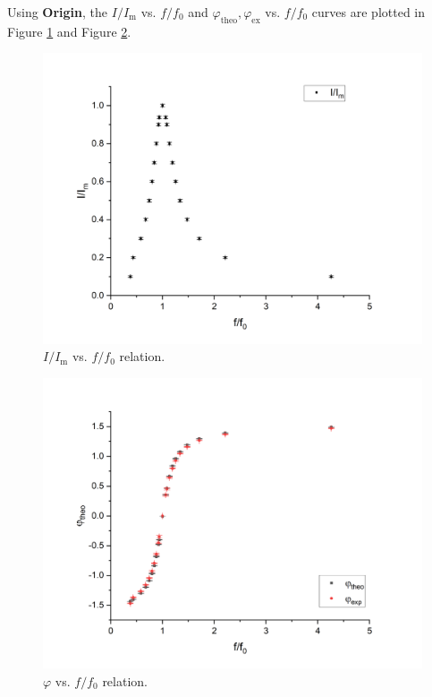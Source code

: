 \documentclass{article}
\begin{document}
Using \textbf{Origin}, the $I/I_\text{m}$ vs. $f/f_0$ and $\varphi_{\text{theo}},\varphi_\text{ex}$ vs. $f/f_0$ curves are plotted in Figure \ref{FigIIm} and Figure \ref{FigPhi}.

\begin{figure}[H]\centering
    \includegraphics[scale=0.5]{I-f.png}
    \caption{$I/I_\text{m}$ vs. $f/f_0$ relation.}\label{FigIIm}
\end{figure}

\begin{figure}[H]\centering
    \includegraphics[scale=0.5]{RLC.png}
    \caption{$\varphi$ vs. $f/f_0$ relation.}\label{FigPhi}
\end{figure}
\end{document}
